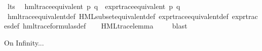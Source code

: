 \begin{isabellebody}
\isanewline
%
\endisadelimvisible
{}\isamarkupfalse%
\ lts\ \isanewline
\isanewline
{}\isamarkupfalse%
\ {\isachardoublequoteopen}hml{\isacharunderscore}{\kern0pt}trace{\isacharunderscore}{\kern0pt}equivalent\ p\ q\ {\isasymlongleftrightarrow}\ expr{\isacharunderscore}{\kern0pt}trace{\isacharunderscore}{\kern0pt}equivalent\ p\ q{\isachardoublequoteclose}\isanewline
%
\isadelimproof
\ \ %
\endisadelimproof
%
\isatagproof
{}\isamarkupfalse%
\ hml{\isacharunderscore}{\kern0pt}trace{\isacharunderscore}{\kern0pt}equivalent{\isacharunderscore}{\kern0pt}def\ HML{\isacharunderscore}{\kern0pt}subset{\isacharunderscore}{\kern0pt}equivalent{\isacharunderscore}{\kern0pt}def\ expr{\isacharunderscore}{\kern0pt}trace{\isacharunderscore}{\kern0pt}equivalent{\isacharunderscore}{\kern0pt}def\ expr{\isacharunderscore}{\kern0pt}traces{\isacharunderscore}{\kern0pt}def\ hml{\isacharunderscore}{\kern0pt}trace{\isacharunderscore}{\kern0pt}formulas{\isacharunderscore}{\kern0pt}def\isanewline
\ \ \isamarkupfalse%
\ HML{\isacharunderscore}{\kern0pt}trace{\isacharunderscore}{\kern0pt}lemma\ \isanewline
\ \ \isamarkupfalse%
\ blast%
\endisatagproof
{\isafoldproof}%
%
\isadelimproof
\isanewline
%
\endisadelimproof
\isanewline
{}\isamarkupfalse%
%
\begin{isamarkuptext}%
On Infinity...%
\end{isamarkuptext}\isamarkuptrue%
%
\isadelimproof
%
\endisadelimproof
%
\isatagproof
%
\endisatagproof
{\isafoldproof}%
%
\isadelimproof
%
\endisadelimproof
%
\isadelimproof
%
\endisadelimproof
%
\isatagproof
%
\endisatagproof
{\isafoldproof}%
%
\isadelimproof
%
\endisadelimproof
%
\isadelimproof
%
\endisadelimproof
%
\isatagproof
%
\endisatagproof
{\isafoldproof}%
%
\isadelimproof
\isanewline
%
\endisadelimproof
{}\isamarkupfalse%
\isanewline
%
\isadelimtheory
%
\endisadelimtheory
%
\isatagtheory
{}\isamarkupfalse%
%
\endisatagtheory
{\isafoldtheory}%
%
\isadelimtheory
%
\endisadelimtheory
%
\end{isabellebody}%
\endinput
